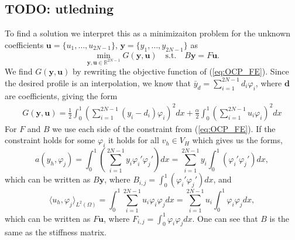 \subsection{TODO: utledning}
To find a solution we interpret this as a minimizaiton problem for the unknown coefficients $\mathbf{u} = \{u_1, \dots, u_{2N-1} \}$, $\mathbf{y} = \{y_1, \dots, y_{2N-1} \}$ as
\begin{equation}
    \label{eq:OCP_coeff}
    \min_{\mathbf{y,u} \in \mathds{R}^{2N-1}} G(\mathbf{y, u}) \quad \text{s.t.} \quad B\mathbf{y} = F\mathbf{u}.
\end{equation}
We find $G(\mathbf{y, u})$ by rewriting the objective function of (\ref{eq:OCP_FE}).
Since the desired profile is an interpolation, we know that $\bar{y}_d = \sum_{i=1}^{2N-1}d_i\varphi_i$, where $\mathbf{d}$ are coefficients, giving the form
\begin{align*}
    G(\mathbf{y, u}) = \frac{1}{2}\int_0^1\left( \sum_{i=1}^{2N-1}\left( y_i -d_i\right) \varphi_i \right)^2dx + \frac{\alpha}{2}\int_0^1\left(\sum_{i=1}^{2N-1} u_i \varphi_i  \right)^2dx     
\end{align*}
For $F$ and $B$ we use each side of the constraint from (\ref{eq:OCP_FE}). If the constraint holds for some $\varphi_i$ it holds for all $v_h\in V_H$ which gives us the forms,
$$a(y_h, \varphi_j) = \int_0^1 \left( \sum_{i=1}^{2N-1} y_i \varphi_i' \varphi_j' \right)dx =\sum_{i=1}^{2N-1} y_i\int_0^1 \left( \varphi_i' \varphi_j' \right)dx,$$
which can be written as $B\mathbf{y}$, where $B_{i,j} = \int_0^1\left( \varphi_i' \varphi_j' \right)dx$, and  
$$\langle u_h, \varphi_j \rangle_{L^2(\Omega)} = \int_0^1 \sum_{i=1}^{2N-1} u_i \varphi_i \varphi_j dx =\sum_{i=1}^{2N-1} u_i \int_0^1  \varphi_i \varphi_j dx,$$
which can be written as $F\mathbf{u}$, where $F_{i,j}=\int_0^1  \varphi_i \varphi_j dx$.
One can see that $B$ is the same as the stiffness matrix.

